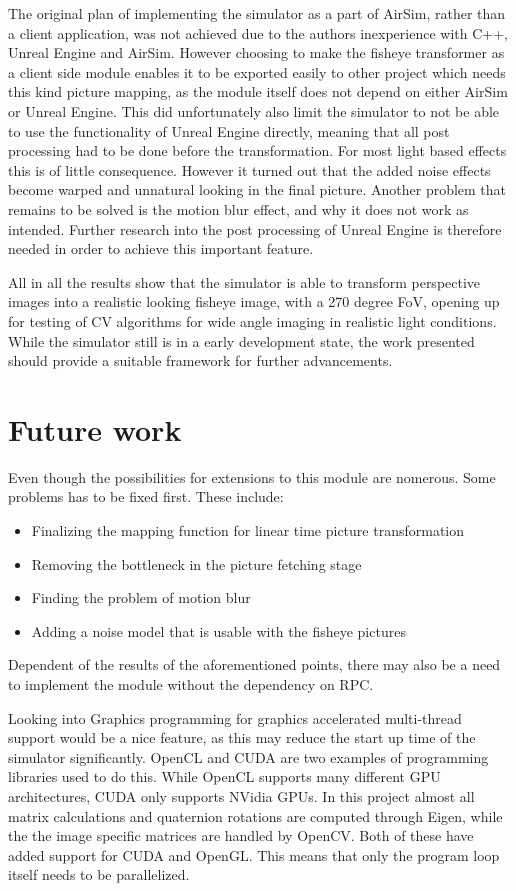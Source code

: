 The original plan of implementing the simulator as a part of AirSim, rather than a client application, was not achieved due to the authors inexperience with C++, Unreal Engine and AirSim. However choosing to make the fisheye transformer as a client side module enables it to be exported easily to other project which needs this kind picture mapping, as the module itself does not depend on either AirSim or Unreal Engine. This did unfortunately also limit the simulator to not be able to use the functionality of Unreal Engine directly, meaning that all post processing had to be done before the transformation. For most light based effects this is of little consequence. However it turned out that the added noise effects become warped and unnatural looking in the final picture. Another problem that remains to be solved is the motion blur effect, and why it does not work as intended. Further research into the post processing of Unreal Engine is therefore needed in order to achieve this important feature. 

All in all the results show that the simulator is able to transform perspective images into a realistic looking fisheye image, with a 270 degree FoV, opening up for testing of CV algorithms for wide angle imaging in realistic light conditions. While the simulator still is in a early development state, the work presented should provide a suitable framework for further advancements.

\section{Future work}

Even though the possibilities for extensions to this module are nomerous. Some problems has to be fixed first. These include:
\begin{itemize}
    \item Finalizing the mapping function for linear time picture transformation
    \item Removing the bottleneck in the picture fetching stage
    \item Finding the problem of motion blur
    \item Adding a noise model that is usable with the fisheye pictures
\end{itemize}

Dependent of the results of the aforementioned points, there may also be a need to implement the module without the dependency on RPC.

Looking into Graphics programming for graphics accelerated multi-thread support would be a nice feature, as this may reduce the start up time of the simulator significantly. OpenCL and CUDA are two examples of programming libraries used to do this. While OpenCL supports many different GPU architectures, CUDA only supports NVidia GPUs. In this project almost all matrix calculations and quaternion rotations are computed through Eigen, while the the image specific matrices are handled by OpenCV. Both of these have added support for CUDA and OpenGL. This means that only the program loop itself needs to be parallelized.

